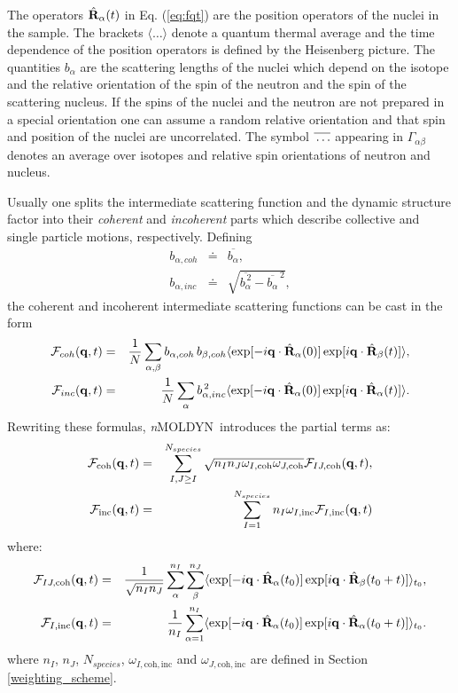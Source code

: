 \documentclass[a4paper,11pt]{report}
\newcommand{\NMOLDYN}{\textit{n}MOLDYN}
\begin{document}
The operators $\hat {\bf R}_\alpha(t)$ in Eq. (\ref{eq:fqt}) are the position operators of the nuclei in the sample. 
The brackets $\langle\ldots\rangle$ denote a quantum thermal average and the time dependence of the position operators 
is defined by the Heisenberg picture.  The quantities $b_\alpha$ are the scattering lengths of the nuclei which depend 
on the isotope and the relative orientation of the spin of the neutron and the spin of the scattering nucleus. If the
spins of the nuclei and the neutron are not prepared in a special orientation one can assume a random relative orientation 
and that spin and position of the nuclei are uncorrelated. The symbol 
$\overline{\rule{0pt}{5pt}\ldots}$ appearing in $\Gamma_{\alpha\beta}$ denotes an average over isotopes and relative spin 
orientations of neutron and nucleus.

Usually one splits the intermediate scattering function and the dynamic structure factor into their {\em coherent} and 
{\em incoherent} parts which describe collective and single particle motions, respectively.
Defining
\begin{eqnarray}
b_{\alpha,coh} &\doteq &\overline{b_\alpha},\\ b_{\alpha,inc} &\doteq
&\sqrt{ \overline{b_\alpha^{\,2}} - \overline{b_\alpha}^{\,2} },
\end{eqnarray}
the coherent and incoherent intermediate scattering functions can be cast in the form
\begin{eqnarray}
{\cal F}_{coh}({\bf q},t) &= &\frac{1}{N}\sum_{\alpha,\beta}
b_{\alpha,coh}\,b_{\beta,coh}
\langle\exp[-i{\bf q}\cdot\hat{\bf R}_\alpha(0)]
       \exp[i{\bf q}\cdot\hat{\bf R}_\beta(t)]\rangle,\\
{\cal F}_{inc}({\bf q},t) &= &\frac{1}{N}\sum_{\alpha}
b_{\alpha,inc}^{\,2}
\langle\exp[-i{\bf q}\cdot\hat{\bf R}_\alpha(0)]
       \exp[i{\bf q}\cdot\hat{\bf R}_\alpha(t)]\rangle.
\end{eqnarray}
Rewriting these formulas, \NMOLDYN\ introduces the partial terms as:
\begin{eqnarray}
\label{eq:fcoh}
{\cal F}_{\mathrm{coh}}({\bf q},t) &= & \sum^{N_{species}}_{I,J \geq I}\sqrt{n_I n_J\omega_{I,\mathrm{coh}}\omega_{J,\mathrm{coh}}}{\cal F}_{IJ,\mathrm{coh}}({\bf q},t),\\
\label{eq:finc}
{\cal F}_{\mathrm{inc}}({\bf q},t) &= &\sum^{N_{species}}_{I = 1}n_I \omega_{I,\mathrm{inc}}{\cal F}_{I,\mathrm{inc}}({\bf q},t)
\end{eqnarray}
where:
\begin{eqnarray}
{\cal F}_{IJ,\mathrm{coh}}({\bf q},t) &= &\frac{1}{\sqrt{n_In_J}}\sum^{n_I}_{\alpha}\sum^{n_J}_{\beta}
\langle\exp[-i{\bf q}\cdot\hat{\bf R}_\alpha(t_0)]
       \exp[i{\bf q}\cdot\hat{\bf R}_\beta(t_0+t)]\rangle_{t_0},\\
{\cal F}_{I,\mathrm{inc}}({\bf q},t) &= & \frac{1}{n_I}\sum^{n_I}_{\alpha = 1}\langle\exp[-i{\bf q}
\cdot\hat{\bf R}_\alpha(t_0)]\exp[i{\bf q}\cdot\hat{\bf R}_\alpha(t_0+t)]\rangle_{t_0}.
\end{eqnarray}
where $n_I$, $n_J$, $N_{species}$, $\omega_{I,\mathrm{coh,inc}}$ and $\omega_{J,\mathrm{coh,inc}}$ are defined in 
Section \ref{weighting_scheme}.
\end{document}
